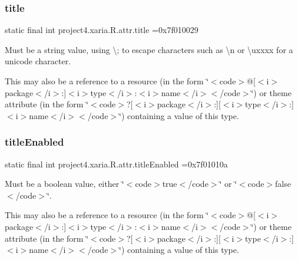 \subsubsection{\texorpdfstring{title}{title}}
{\footnotesize\ttfamily static final int project4.\+xaria.\+R.\+attr.\+title =0x7f010029\hspace{0.3cm}{\ttfamily [static]}}

Must be a string value, using \textquotesingle{}\textbackslash{};\textquotesingle{} to escape characters such as \textquotesingle{}\textbackslash{}n\textquotesingle{} or \textquotesingle{}\textbackslash{}uxxxx\textquotesingle{} for a unicode character. 

This may also be a reference to a resource (in the form \char`\"{}$<$code$>$@\mbox{[}$<$i$>$package$<$/i$>$\+:\mbox{]}$<$i$>$type$<$/i$>$\+:$<$i$>$name$<$/i$>$$<$/code$>$\char`\"{}) or theme attribute (in the form \char`\"{}$<$code$>$?\mbox{[}$<$i$>$package$<$/i$>$\+:\mbox{]}\mbox{[}$<$i$>$type$<$/i$>$\+:\mbox{]}$<$i$>$name$<$/i$>$$<$/code$>$\char`\"{}) containing a value of this type. \mbox{\label{classproject4_1_1xaria_1_1R_1_1attr_a9ac0767b9114d9fdd93f429cd5c1c5ba}} 
\subsubsection{\texorpdfstring{title\+Enabled}{titleEnabled}}
{\footnotesize\ttfamily static final int project4.\+xaria.\+R.\+attr.\+title\+Enabled =0x7f01010a\hspace{0.3cm}{\ttfamily [static]}}

Must be a boolean value, either \char`\"{}$<$code$>$true$<$/code$>$\char`\"{} or \char`\"{}$<$code$>$false$<$/code$>$\char`\"{}. 

This may also be a reference to a resource (in the form \char`\"{}$<$code$>$@\mbox{[}$<$i$>$package$<$/i$>$\+:\mbox{]}$<$i$>$type$<$/i$>$\+:$<$i$>$name$<$/i$>$$<$/code$>$\char`\"{}) or theme attribute (in the form \char`\"{}$<$code$>$?\mbox{[}$<$i$>$package$<$/i$>$\+:\mbox{]}\mbox{[}$<$i$>$type$<$/i$>$\+:\mbox{]}$<$i$>$name$<$/i$>$$<$/code$>$\char`\"{}) containing a value of this type. \mbox{\label{classproject4_1_1xaria_1_1R_1_1attr_af1a704f2a2dce75feee66d6e973fe45c}} 
